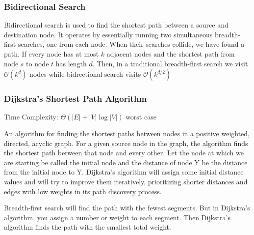\documentclass{article}
\begin{document}
    \subsubsection{Bidirectional Search}
    Bidirectional search is used to find the shortest path between a source and destination node. It operates by essentially running two simultaneous breadth-first searches, one from each node. When their searches collide, we have found a path.  If every node has at most $k$ adjacent nodes and the shortest path from node $s$ to node $t$ has length $d$. Then, in a traditional breadth-first search we visit $\mathcal{O}(k^d)$ nodes while bidrectional search visits $\mathcal{O}(k^{d/2})$

    \subsubsection{Dijkstra's Shortest Path Algorithm}
    Time Complexity: $\Theta (|E|+|V|\log |V|)$ worst case
    
    An algorithm for finding the shortest paths between nodes in a positive weighted, directed, acyclic graph. For a given source node in the graph, the algorithm finds the shortest path between that node and every other. Let the node at which we are starting be called the initial node and the distance of node Y be the distance from the initial node to Y. Dijkstra's algorithm will assign some initial distance values and will try to improve them iteratively, prioritizing shorter distances and edges with low weights in its path discovery process.
    
    Breadth-first search will find the path with the fewest segments. But in Dijkstra’s algorithm, you assign a number or weight to each segment. Then Dijkstra’s algorithm finds the path with the smallest total weight.
    
\end{document}
